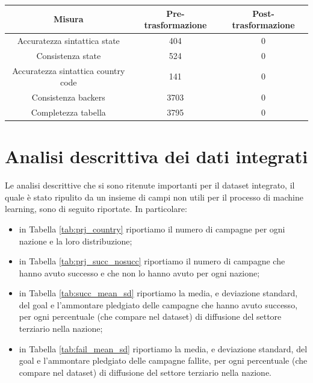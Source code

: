 \begin{tabular}{|c|c|c|}
	\hline 
	Misura & Pre-trasformazione & Post-trasformazione \\ 
	\hline 
	Accuratezza sintattica state & 404 & 0 \\ 
	\hline 
	Consistenza state & 524 & 0 \\ 
	\hline 
	Accuratezza sintattica country code & 141 & 0 \\ 
	\hline 
	Consistenza backers & 3703 & 0 \\ 
	\hline 
	Completezza tabella & 3795 & 0 \\ 
	\hline 
\end{tabular} 

\section{Analisi descrittiva dei dati integrati}
Le analisi descrittive che si sono ritenute importanti per il dataset integrato, il quale è stato ripulito da un insieme di campi non utili per il processo di machine learning, sono di seguito riportate.
In particolare:
\begin{itemize}
	\item in Tabella \ref{tab:prj_country} riportiamo il numero di campagne per ogni nazione e la loro distribuzione;
	\item in Tabella \ref{tab:prj_succ_nosucc} riportiamo il numero di campagne che hanno avuto successo e che non lo hanno avuto per ogni nazione;
	\item in Tabella \ref{tab:succ_mean_sd} riportiamo la media, e deviazione standard, del goal e l'ammontare pledgiato delle campagne che hanno avuto successo, per ogni percentuale (che compare nel dataset) di diffusione del settore terziario nella nazione; 
	\item in Tabella \ref{tab:fail_mean_sd} riportiamo la media, e deviazione standard, del goal e l'ammontare pledgiato delle campagne fallite, per ogni percentuale (che compare nel dataset) di diffusione del settore terziario nella nazione.
\end{itemize} 

